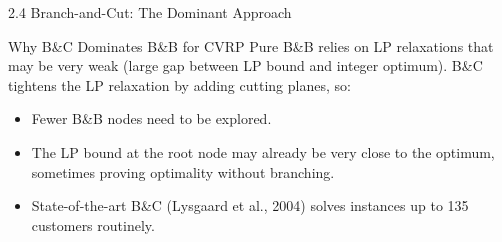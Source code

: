 \documentclass[aspectratio=169,10pt]{beamer}
\begin{document}
\begin{frame}[allowframebreaks]{2.4 Branch-and-Cut: The Dominant Approach}
  \framebreak

  \begin{alertblock}{Why B\&C Dominates B\&B for CVRP}
    Pure B\&B relies on LP relaxations that may be very weak (large gap between
    LP bound and integer optimum). B\&C tightens the LP relaxation by adding
    cutting planes, so:
    \begin{itemize}
      \item Fewer B\&B nodes need to be explored.
      \item The LP bound at the root node may already be very close to the
            optimum, sometimes proving optimality without branching.
      \item State-of-the-art B\&C (Lysgaard et al., 2004) solves instances
            up to 135 customers routinely.
    \end{itemize}
  \end{alertblock}
\end{frame}

\end{document}
